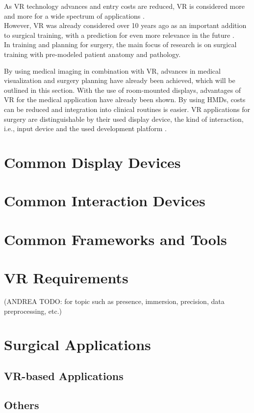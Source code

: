 As VR technology advances and entry costs are reduced, VR is considered more and more for a wide spectrum of applications \cite{Ayoub.2019, Berni.2020}.
\\ However, VR was already considered over 10 years ago as an important addition to surgical training, with a prediction for even more relevance in the future \cite{RN60}.
\\ In training and planning for surgery, the main focus of research is on surgical training with pre-modeled patient anatomy and pathology.

By using medical imaging in combination with VR, advances in medical visualization and surgery planning have already been achieved, which will be outlined in this section.
With the use of room-mounted displays, advantages of VR for the medical application have already been shown.
By using HMDs, costs can be reduced and integration into clinical routines is easier.
VR applications for surgery are distinguishable by their used display device, the kind of interaction, i.e., input device and the used development platform \cite{Vaughan.2016}.

\section{\label{sec::DisplayDevices}Common Display Devices}


\section{\label{sec::InteractionDevices}Common Interaction Devices}%


\section{\label{sec::FrameworksAndTools}Common Frameworks and Tools}


\section{\label{sec::VRRequirements}VR Requirements}
(ANDREA TODO: for topic such as presence, immersion, precision, data preprocessing, etc.)

\section{\label{sec::SurgicalApplications}Surgical Applications}

\subsection{\label{sec::VRBasedApplications}VR-based Applications}


\subsection{\label{sec::Others}Others}%

